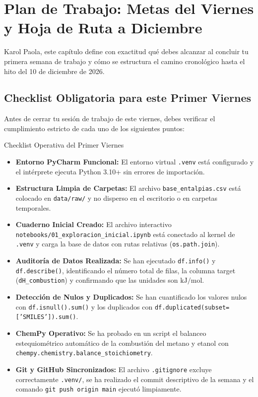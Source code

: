 \documentclass[11pt,letterpaper]{report}
\begin{document}
\newpage

\chapter{Plan de Trabajo: Metas del Viernes y Hoja de Ruta a Diciembre}

Karol Paola, este capítulo define con exactitud qué debes alcanzar al concluir tu primera semana de trabajo y cómo se estructura el camino cronológico hasta el hito del 10 de diciembre de 2026.

\section{Checklist Obligatoria para este Primer Viernes}
Antes de cerrar tu sesión de trabajo de este viernes, debes verificar el cumplimiento estricto de cada uno de los siguientes puntos:

\begin{protocolbox}{Checklist Operativa del Primer Viernes}
\begin{itemize}[leftmargin=*]
    \item[$\square$] \textbf{Entorno PyCharm Funcional:} El entorno virtual \texttt{.venv} está configurado y el intérprete ejecuta Python 3.10+ sin errores de importación.
    \item[$\square$] \textbf{Estructura Limpia de Carpetas:} El archivo \texttt{base\_entalpias.csv} está colocado en \texttt{data/raw/} y no disperso en el escritorio o en carpetas temporales.
    \item[$\square$] \textbf{Cuaderno Inicial Creado:} El archivo interactivo \texttt{notebooks/01\_exploracion\_inicial.ipynb} está conectado al kernel de \texttt{.venv} y carga la base de datos con rutas relativas (\texttt{os.path.join}).
    \item[$\square$] \textbf{Auditoría de Datos Realizada:} Se han ejecutado \texttt{df.info()} y \texttt{df.describe()}, identificando el número total de filas, la columna target (\texttt{dH\_combustion}) y confirmando que las unidades son $\text{kJ/mol}$.
    \item[$\square$] \textbf{Detección de Nulos y Duplicados:} Se han cuantificado los valores nulos con \texttt{df.isnull().sum()} y los duplicados con \texttt{df.duplicated(subset=['SMILES']).sum()}.
    \item[$\square$] \textbf{ChemPy Operativo:} Se ha probado en un script el balanceo estequiométrico automático de la combustión del metano y etanol con \texttt{chempy.chemistry.balance\_stoichiometry}.
    \item[$\square$] \textbf{Git y GitHub Sincronizados:} El archivo \texttt{.gitignore} excluye correctamente \texttt{.venv/}, se ha realizado el commit descriptivo de la semana y el comando \texttt{git push origin main} ejecutó limpiamente.
\end{itemize}
\end{protocolbox}
\end{document}
